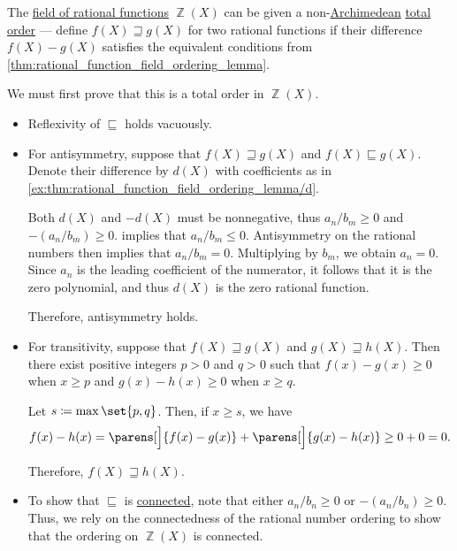 \begin{example}\label{ex:rational_function_field_non_archimedean}
  The \hyperref[def:rational_function_field]{field of rational functions} \( \BbbZ(X) \) can be given a non-\hyperref[def:archimedean_semiring]{Archimedean} \hyperref[def:totally_ordered_set]{total order} --- define \( f(X) \sqsupseteq g(X) \) for two rational functions if their difference \( f(X) - g(X) \) satisfies the equivalent conditions from \cref{thm:rational_function_field_ordering_lemma}.

  We must first prove that this is a total order in \( \BbbZ(X) \).
  \begin{itemize}
    \item Reflexivity of \( {\sqsubseteq} \) holds vacuously.

    \item For antisymmetry, suppose that \( f(X) \sqsupseteq g(X) \) and \( f(X) \sqsubseteq g(X) \). Denote their difference by \( d(X) \) with coefficients as in \eqref{ex:thm:rational_function_field_ordering_lemma/d}.

    Both \( d(X) \) and \( -d(X) \) must be nonnegative, thus \( a_n / b_m \geq 0 \) and \( -(a_n / b_m) \geq 0 \).  implies that \( a_n / b_m \leq 0 \). Antisymmetry on the rational numbers then implies that \( a_n / b_m = 0 \). Multiplying by \( b_m \), we obtain \( a_n = 0 \). Since \( a_n \) is the leading coefficient of the numerator, it follows that it is the zero polynomial, and thus \( d(X) \) is the zero rational function.

    Therefore, antisymmetry holds.

    \item For transitivity, suppose that \( f(X) \sqsupseteq g(X) \) and \( g(X) \sqsupseteq h(X) \). Then there exist positive integers \( p > 0 \) and \( q > 0 \) such that \( f(x) - g(x) \geq 0 \) when \( x \geq p \) and \( g(x) - h(x) \geq 0 \) when \( x \geq q \).

    Let \( s \coloneqq \max\set{ p, q } \). Then, if \( x \geq s \), we have
    \begin{equation*}
      f(x) - h(x) = \parens[\Big]{ f(x) - g(x) } + \parens[\Big]{ g(x) - h(x) } \geq 0 + 0 = 0.
    \end{equation*}

    Therefore, \( f(X) \sqsupseteq h(X) \).

    \item To show that \( {\sqsubseteq} \) is \hyperref[def:binary_relation/connected]{connected}, note that either \( a_n / b_n \geq 0 \) or \( -(a_n / b_n) \geq 0 \). Thus, we rely on the connectedness of the rational number ordering to show that the ordering on \( \BbbZ(X) \) is connected.
  \end{itemize}


\end{example}
